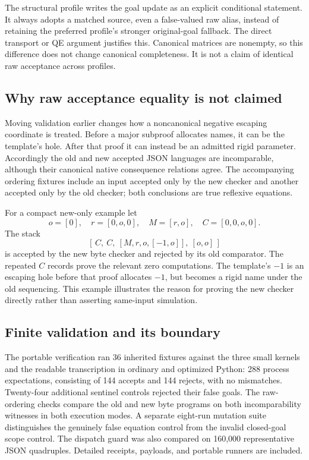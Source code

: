 \documentclass[11pt,letterpaper]{article}
\theoremstyle{definition}\newtheorem{definition}[theorem]{Definition}
\theoremstyle{remark}\newtheorem{remark}[theorem]{Remark}
\begin{document}
The structural profile writes the goal update as an explicit conditional
statement. It always adopts a matched source, even a false-valued raw
alias, instead of retaining the preferred profile's stronger original-goal
fallback. The direct transport or QE argument justifies this. Canonical
matrices are nonempty, so this difference does not change canonical
completeness. It is not a claim of identical raw acceptance across profiles.

\subsection{Why raw acceptance equality is not claimed}

Moving validation earlier changes how a noncanonical negative escaping
coordinate is treated. Before a major subproof allocates names, it can
be the template's hole. After that proof it can instead be an admitted
rigid parameter. Accordingly the old and new accepted JSON languages
are incomparable, although their canonical native consequence relations
agree. The accompanying ordering fixtures include an input accepted
only by the new checker and another accepted only by the old checker;
both conclusions are true reflexive equations.

For a compact new-only example let
\[
 o=[0],\quad r=[0,o,0],\quad M=[r,o],\quad C=[0,0,o,0].
\]
The stack
\[
 [\,C,\ C,\ [M,r,o,[-1,o]],\ [o,o]\,]
\]
is accepted by the new byte checker and rejected by its old comparator.
The repeated $C$ records prove the relevant zero computations. The
template's $-1$ is an escaping hole before that proof allocates $-1$,
but becomes a rigid name under the old sequencing. This example
illustrates the reason for proving the new checker directly rather
than asserting same-input simulation.

\subsection{Finite validation and its boundary}
The portable verification ran 36 inherited fixtures against the three
small kernels and the readable transcription in ordinary and optimized
Python: 288 process expectations, consisting of 144 accepts and 144
rejects, with no mismatches. Twenty-four additional sentinel controls
rejected their false goals. The raw-ordering checks compare the old and
new byte programs on both incomparability witnesses in both execution
modes. A separate eight-run mutation suite distinguishes the genuinely
false equation control from the invalid closed-goal scope control.
The dispatch guard was also compared on 160,000 representative JSON
quadruples. Detailed receipts, payloads, and portable runners are included.
\end{document}
